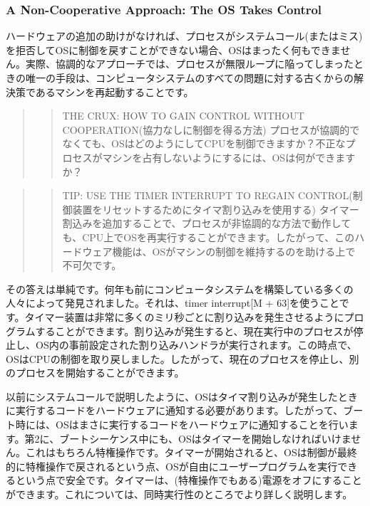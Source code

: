 \hypertarget{a-non-cooperative-approach-the-os-takes-control}{%
\subsubsection*{A Non-Cooperative Approach: The OS Takes
Control}\label{a-non-cooperative-approach-the-os-takes-control}}

ハードウェアの追加の助けがなければ、プロセスがシステムコール(またはミス)を拒否してOSに制御を戻すことができない場合、OSはまったく何もできません。実際、協調的なアプローチでは、プロセスが無限ループに陥ってしまったときの唯一の手段は、コンピュータシステムのすべての問題に対する古くからの解決策であるマシンを再起動することです。

\begin{quote}
\begin{quote}
THE CRUX: HOW TO GAIN CONTROL WITHOUT
COOPERATION(協力なしに制御を得る方法)
プロセスが協調的でなくても、OSはどのようにしてCPUを制御できますか？不正なプロセスがマシンを占有しないようにするには、OSは何ができますか？
\end{quote}
\end{quote}

\begin{quote}
\begin{quote}
TIP: USE THE TIMER INTERRUPT TO REGAIN
CONTROL(制御装置をリセットするためにタイマ割り込みを使用する)
タイマー割込みを追加することで、プロセスが非協調的な方法で動作しても、CPU上でOSを再実行することができます。したがって、このハードウェア機能は、OSがマシンの制御を維持するのを助ける上で不可欠です。
\end{quote}
\end{quote}

その答えは単純です。何年も前にコンピュータシステムを構築している多くの人々によって発見されました。それは、timer
interrupt{[}M +
63{]}を使うことです。タイマー装置は非常に多くのミリ秒ごとに割り込みを発生させるようにプログラムすることができます。割り込みが発生すると、現在実行中のプロセスが停止し、OS内の事前設定された割り込みハンドラが実行されます。この時点で、OSはCPUの制御を取り戻しました。したがって、現在のプロセスを停止し、別のプロセスを開始することができます。

以前にシステムコールで説明したように、OSはタイマ割り込みが発生したときに実行するコードをハードウェアに通知する必要があります。したがって、ブート時には、OSはまさに実行するコードをハードウェアに通知することを行います。第2に、ブートシーケンス中にも、OSはタイマーを開始しなければいけません。これはもちろん特権操作です。タイマーが開始されると、OSは制御が最終的に特権操作で戻されるという点、OSが自由にユーザープログラムを実行できるという点で安全です。タイマーは、(特権操作でもある)電源をオフにすることができます。これについては、同時実行性のところでより詳しく説明します。

